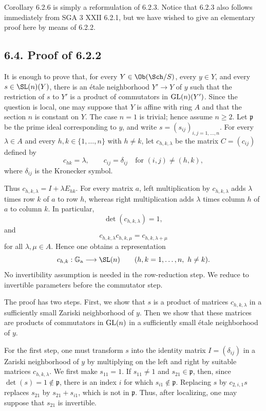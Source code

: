 Corollary 6.2.6 is simply a reformulation of 6.2.3. Notice that 6.2.3 also
follows immediately from SGA 3 XXII 6.2.1, but we have wished to give an
elementary proof here by means of 6.2.2.

\subsection*{6.4. Proof of 6.2.2}
It is enough to prove that, for every $Y\in\Ob(\Sch/S)$, every $y\in Y$,
and every $s\in\SL(n)(Y)$, there is an \'etale neighborhood $Y'\to Y$ of
$y$ such that the restriction of $s$ to $Y'$ is a product of commutators
in $\operatorname{GL}(n)(Y')$. Since the question is local, one may suppose that $Y$ is
affine with ring $A$ and that the section $n$ is constant on $Y$. The case
$n=1$ is trivial; hence assume $n\geq2$. Let
$\mathfrak p$ be the prime ideal corresponding to $y$, and write
$s=(s_{ij})_{i,j=1,\ldots,n}$. For every $\lambda\in A$ and every
$h,k\in\{1,\ldots,n\}$ with $h\ne k$, let $c_{h,k,\lambda}$ be the matrix
$C=(c_{ij})$ defined by
\[
c_{hk}=\lambda,\qquad
c_{ij}=\delta_{ij}\quad\text{for }(i,j)\ne(h,k),
\]
where $\delta_{ij}$ is the Kronecker symbol.

Thus $c_{h,k,\lambda}=I+\lambda E_{hk}$. For every matrix $a$, left
multiplication by $c_{h,k,\lambda}$ adds $\lambda$ times row $k$ of $a$ to
row $h$, whereas right multiplication adds $\lambda$ times column $h$ of
$a$ to column $k$. In particular,
\[
\det(c_{h,k,\lambda})=1,
\]
and
\begin{equation}\tag{6.3.1}
c_{h,k,\lambda}c_{h,k,\mu}=c_{h,k,\lambda+\mu}
\end{equation}
for all $\lambda,\mu\in A$. Hence one obtains a representation
\[
c_{h,k}:\mathbb G_{\mathrm a}\longrightarrow\SL(n)
\qquad(h,k=1,\ldots,n,\ h\ne k).
\]
No invertibility assumption is needed in the row-reduction step. We reduce
to invertible parameters before the commutator step.

The proof has two steps. First, we show that $s$ is a product of matrices
$c_{h,k,\lambda}$ in a sufficiently small Zariski neighborhood of $y$.
Then we show that these matrices are products of commutators in $\operatorname{GL}(n)$ in
a sufficiently small \'etale neighborhood of $y$.

For the first step, one must transform $s$ into the identity matrix
$I=(\delta_{ij})$ in a Zariski neighborhood of $y$ by multiplying on the
left and right by suitable matrices $c_{h,k,\lambda}$. We first make
$s_{11}=1$. If $s_{11}\ne1$ and $s_{21}\in\mathfrak p$, then, since
$\det(s)=1\notin\mathfrak p$, there is an index $i$ for which
$s_{i1}\notin\mathfrak p$. Replacing $s$ by $c_{2,i,1}s$ replaces
$s_{21}$ by $s_{21}+s_{i1}$, which is not in $\mathfrak p$. Thus, after
localizing, one may suppose that $s_{21}$ is invertible.

